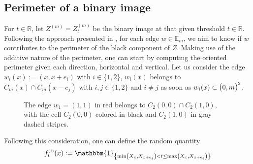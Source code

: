 \documentclass[12pt]{article}
\theoremstyle{Theorem}
\begin{document}
\subsection{Perimeter of a binary image}\label{methods}
For $t \in \mathbb{R}$, let $Z^{\scriptscriptstyle (m)} = Z^{\scriptscriptstyle (m)}_{t}$ be the  binary image at that given threshold $t \in \mathbb{R}$. Following  the approach  presented in \cite{HermineAgnes},  for each edge $w \in \mathbb{E}_{m}$, we aim to know if  $w$ contributes  to the perimeter of the black component of $Z$. Making use of the additive nature of the perimeter, one can start by computing the oriented perimeter given each direction, horizontal and vertical. Let us consider the edge $w_{i}(x) := \left(x, x+e_{i}\right)$ with $i \in \{1,2\}$, $w_{i}(x)$ belongs to $C_{m}(x) \cap C_{m}(x-e_{j})$ with $i,j \in \{1,2\}$ and $i \neq j$ as soon as $w_{i}(x) \subset  \text{\larger[1]{$($}}0, m \text{\larger[1]{$)$}}^{2}$.
\begin{figure}[H]
\begin{center}
\end{center}
\vspace{-0.25cm}
\caption{The edge $w_{1} = (1,1)$ in red belongs to $C_{2}(0,0) \cap C_{2}(1, 0)$, with the cell $C_{2}(0,0)$ colored in black and $C_{2}(1, 0)$ in gray dashed stripes.}
\label{fig1}
\end{figure}
\vspace{-0.5cm}
Following this consideration, one can define the random quantity
\begin{equation}
f_{t}^{\scriptscriptstyle (i)}(x) := \mathbbm{1}_{\left\{\min\left(X_{x}, X_{\scriptscriptstyle x +e_{i}}\right) < t \leq \max\left(X_{x}, X_{\scriptscriptstyle x+e_{i}}\right)\right\}}
\label{fi}
\end{equation}
\end{document}
